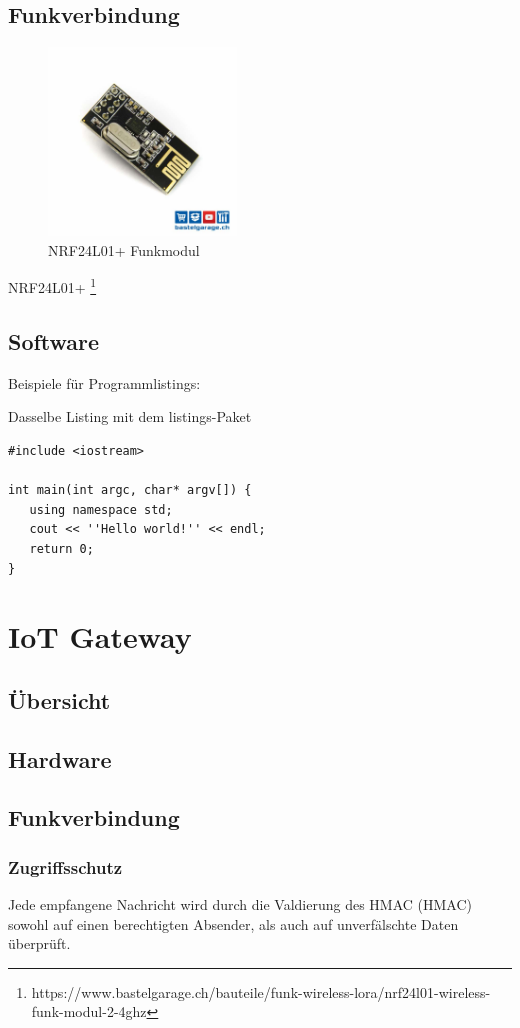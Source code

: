 \documentclass[
  10pt, %
  a4paper, %
  twoside, %
  openright, %
  numbers=noenddot, %
  BCOR=5mm, %
  parskip=half*, %
  thesis, %
]{bfhbook}
\begin{document}
 \section{Funkverbindung}
 
  \begin{figure}[htp]
  \begin{center}
    \includegraphics[width=5cm, left]{Bilder/NRF24.jpg}
  \end{center}
    \caption{NRF24L01+ Funkmodul}
  \label{fig:dhtnrf24}
\end{figure}
NRF24L01+ \footnote{https://www.bastelgarage.ch/bauteile/funk-wireless-lora/nrf24l01-wireless-funk-modul-2-4ghz}
 
 \section{Software}
Beispiele für Programmlistings:

Dasselbe Listing mit dem listings-Paket
\lstset{language=C}
\begin{lstlisting}
#include <iostream>

int main(int argc, char* argv[]) {
   using namespace std;
   cout << ''Hello world!'' << endl;
   return 0;
}
\end{lstlisting}

%
\chapter{IoT Gateway}
\section{Übersicht}
\section{Hardware}
\section{Funkverbindung}
\subsection{Zugriffsschutz}
Jede empfangene Nachricht wird durch die Valdierung des HMAC (\Gls{HMAC}) sowohl auf einen berechtigten Absender, als auch auf unverfälschte Daten überprüft.
\end{document}
